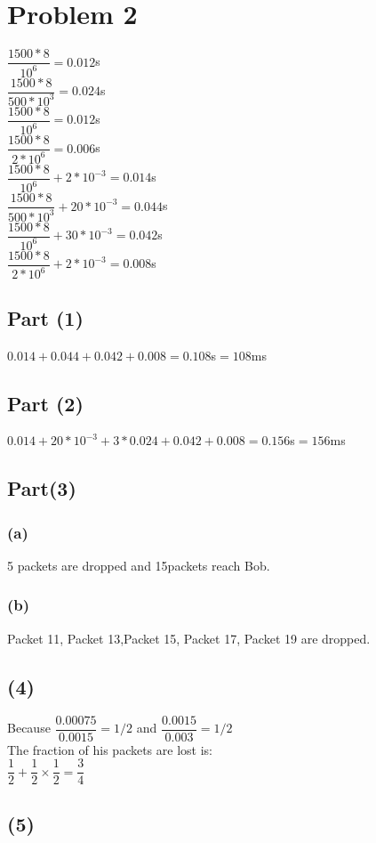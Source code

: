 \documentclass[11pt]{article}
\begin{document}
\pagestyle{plain}
\section*{Problem 2}
$\dfrac{1500*8}{10^6}=0.012$s\\
$\dfrac{1500*8}{500*10^3}=0.024$s\\
$\dfrac{1500*8}{10^6}=0.012$s\\
$\dfrac{1500*8}{2*10^6}=0.006$s\\
$\dfrac{1500*8}{10^6}+2*10^{-3}=0.014$s\\
$\dfrac{1500*8}{500*10^{3}}+20*10^{-3}=0.044$s\\
$\dfrac{1500*8}{10^6}+30*10^{-3}=0.042$s\\
$\dfrac{1500*8}{2*10^6}+2*10^{-3}=0.008$s
\subsection*{Part (1)}
$0.014+0.044+0.042+0.008=0.108$s$=108$ms
\subsection*{Part (2)}
$0.014+20*10^{-3}+3*0.024+0.042+0.008=0.156$s$=156$ms
\subsection*{Part(3)}
\subsubsection*{(a)}
5 packets are dropped and 15packets reach Bob.
\subsubsection*{(b)}
Packet 11, Packet 13,Packet 15, Packet 17, Packet 19 are dropped.
\subsection*{(4)}
Because $\dfrac{0.00075}{0.0015}=1/2$ and $\dfrac{0.0015}{0.003}=1/2$\\
The fraction of his packets are lost is:\\
$\dfrac{1}{2}+\dfrac{1}{2}\times\dfrac{1}{2}=\dfrac{3}{4}$
\subsection*{(5)}
\end{document}

